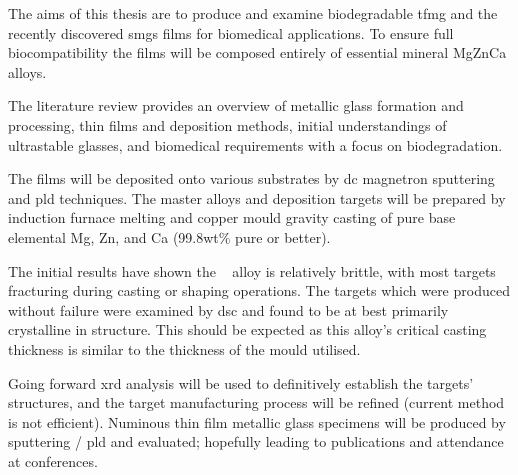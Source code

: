 \documentclass[a4paper,12pt,oneside]{report}%
\begin{document}
The aims of this thesis are to produce and examine biodegradable \gls{tfmg} and the recently discovered \glspl{smg} films for biomedical applications. To ensure full biocompatibility the films will be composed entirely of essential mineral MgZnCa alloys.

The literature review provides an overview of metallic glass formation and processing, thin films and deposition methods, initial understandings of ultrastable glasses, and biomedical requirements with a focus on biodegradation. 

The films will be deposited onto various substrates by \gls{dc} magnetron sputtering and \gls{pld} techniques. The master alloys and deposition targets will be prepared by induction furnace melting and copper mould gravity casting of pure base elemental Mg, Zn, and Ca (99.8wt\% pure or better).

The initial results have shown the \MgZnCa~ alloy is relatively brittle, with most targets fracturing during casting or shaping operations. The targets which were produced without failure were examined by \acrshort{dsc} and found to be at best primarily crystalline in structure. This should be expected as this alloy's critical casting thickness is similar to the thickness of the mould utilised. 

Going forward \acrshort{xrd} analysis will be used to definitively establish the targets' structures, and the target manufacturing process will be refined (current method is not efficient). Numinous thin film metallic glass specimens will be produced by sputtering / \gls{pld} and evaluated; hopefully leading to publications and attendance at conferences.



\newpage
\tableofcontents\newpage
{}
\listoffigures\newpage
\listoftables\newpage
\clearpage %
\end{document}
